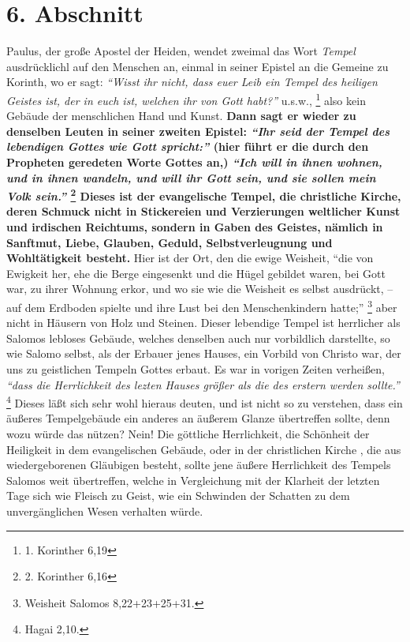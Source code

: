 \section{6. Abschnitt} \label{kap5_ab6}

 
Paulus, der große Apostel der Heiden, wendet zweimal das Wort \textit{Tempel}
ausdrücklichl auf den Menschen an, einmal in seiner Epistel an die Gemeine zu
Korinth, wo er sagt:
\textit{"`Wisst ihr nicht, dass euer Leib ein Tempel des heiligen
Geistes ist, der in euch ist, welchen ihr von Gott habt?"'} u.s.w.,
\footnote{1. Korinther 6,19}
also kein Gebäude der menschlichen Hand und Kunst.
\label{ref:05_06_tempel}
\textbf{Dann sagt er
wieder zu denselben Leuten in seiner zweiten Epistel:
\textit{"`Ihr seid der Tempel des lebendigen Gottes wie Gott spricht:"'} (hier
führt er die durch den Propheten
geredeten Worte Gottes an,)
\textit{"`Ich will in ihnen wohnen, und in ihnen wandeln, und will ihr Gott
sein, und sie sollen mein Volk sein."'}
\footnote{2. Korinther 6,16}
Dieses ist der
evangelische Tempel, die christliche Kirche, deren
Schmuck nicht in Stickereien
und Verzierungen weltlicher Kunst und irdischen Reichtums, sondern in Gaben des
Geistes, nämlich in Sanftmut, Liebe, Glauben, Geduld,
Selbstverleugnung und
Wohltätigkeit besteht.} Hier ist der Ort, den die ewige Weisheit,  "`die von
Ewigkeit her, ehe die Berge eingesenkt und die Hügel gebildet waren, bei Gott
war, zu ihrer Wohnung erkor, und wo sie wie die Weisheit es selbst ausdrückt, --
auf dem Erdboden spielte und ihre Lust bei den Menschenkindern
hatte;"'
\footnote{Weisheit Salomos 8,22+23+25+31.}
aber nicht in Häusern von Holz
und Steinen. Dieser lebendige Tempel ist herrlicher als Salomos lebloses
Gebäude, welches denselben auch nur vorbildlich darstellte, so wie Salomo
selbst, als der Erbauer jenes Hauses, ein Vorbild von Christo war, der uns zu
geistlichen Tempeln Gottes erbaut. Es war in vorigen Zeiten verheißen,
\textit{"`dass die Herrlichkeit des lezten Hauses größer als die des erstern
werden
sollte."'}
\footnote{Hagai 2,10.}
Dieses läßt sich sehr wohl hieraus deuten, und
ist nicht so zu verstehen, dass ein äußeres Tempelgebäude ein anderes an äußerem
Glanze übertreffen sollte, denn wozu würde das nützen? Nein! Die göttliche
Herrlichkeit, die Schönheit der Heiligkeit in dem evangelischen Gebäude, oder in
der christlichen Kirche ,
die aus wiedergeborenen  Gläubigen besteht, sollte jene
äußere Herrlichkeit des Tempels Salomos weit übertreffen, welche in
Vergleichung mit der Klarheit der letzten Tage sich wie Fleisch zu Geist, wie
ein Schwinden der Schatten zu dem unvergänglichen Wesen verhalten würde.

